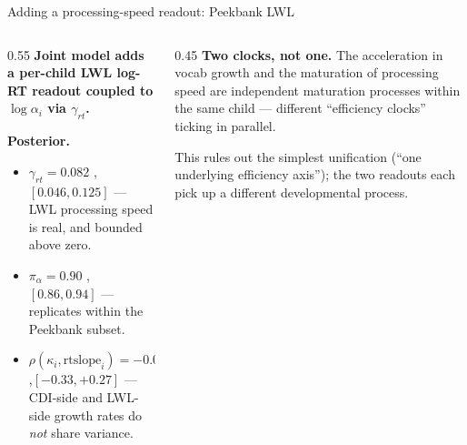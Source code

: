 \documentclass[
  ignorenonframetext,
  aspectratio=169,
  t]{beamer}
\providecommand{\tightlist}{%
  \setlength{\itemsep}{0pt}\setlength{\parskip}{0pt}}
\begin{document}
\begin{frame}{Adding a processing-speed readout: Peekbank LWL}
\label{adding-a-processing-speed-readout-peekbank-lwl}
\begin{columns}[T]
\begin{column}{0.55\linewidth}
\textbf{Joint model adds a per-child LWL log-RT readout coupled to
\(\log\alpha_i\) via \(\gamma_{rt}\).}

\vspace{0.5em}

\textbf{Posterior.}

\begin{itemize}
\tightlist
\item
  \(\gamma_{rt} = 0.082\) ,\([0.046, 0.125]\) --- LWL processing speed
  is real, and bounded above zero.
\item
  \(\pi_\alpha = 0.90\) ,\([0.86, 0.94]\) --- replicates within the
  Peekbank subset.
\item
  \(\rho(\kappa_i, \mathrm{rtslope}_i) = -0.02\) ,\([-0.33, +0.27]\) ---
  CDI-side and LWL-side growth rates do \emph{not} share variance.
\end{itemize}
\end{column}

\begin{column}{0.45\linewidth}
\textbf{Two clocks, not one.} The acceleration in vocab growth and the
maturation of processing speed are independent maturation processes
within the same child --- different ``efficiency clocks'' ticking in
parallel.

\vspace{0.5em}

This rules out the simplest unification (``one underlying efficiency
axis''); the two readouts each pick up a different developmental
process.
\end{column}
\end{columns}
\end{frame}
\end{document}
